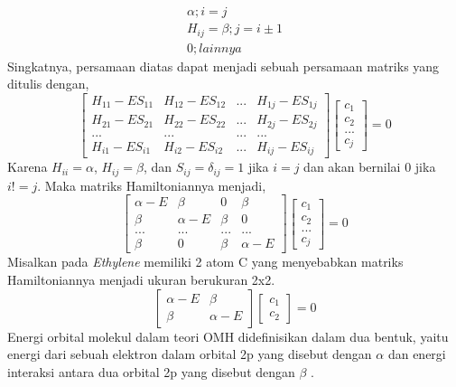 \documentclass[12pt,a4paper]{report}
\begin{document}
	\begin{equation}
	\begin{split}
	\alpha ; i = j
	\\
	H_{ij} = \beta ; j = i{\pm}1
	\\
	0 ; lainnya
	\end{split}
	\end{equation}
	Singkatnya, persamaan diatas dapat menjadi sebuah persamaan matriks yang ditulis dengan,
	\begin{equation}
	\begin{bmatrix}
	{H_{11}-ES_{11}} & {H_{12}-ES_{12}} & ... &{H_{1j}-ES_{1j}}\\
	{H_{21}-ES_{21}} & {H_{22}-ES_{22}} & ... &{H_{2j}-ES_{2j}}\\
	... & ... & ... & ... \\
	{H_{i1}-ES_{i1}} & {H_{i2}-ES_{i2}} & ... &{H_{ij}-ES_{ij}}
	\end{bmatrix}
	\begin{bmatrix}c_1 \\ c_2 \\ ... \\ c_j \end{bmatrix} = 0
	\end{equation}
	Karena {$H_{ii} = \alpha$}, {$H_{ij} = \beta$}, dan {$S_{ij} = \delta_{ij} = 1$} jika {$i=j$} dan akan bernilai 0 jika {$i!=j$}. Maka matriks Hamiltoniannya menjadi,
	\begin{equation}
	\begin{bmatrix}
	\alpha - E & \beta & 0 &\beta \\
	\beta & \alpha - E & \beta & 0\\
	... & ... & ... & ... \\
	\beta & 0 & \beta & \alpha - E
	\end{bmatrix}
	\begin{bmatrix}c_1 \\ c_2 \\ ... \\ c_j \end{bmatrix} = 0
	\end{equation}
	Misalkan pada \textit{Ethylene} memiliki 2 atom C yang menyebabkan matriks Hamiltoniannya menjadi ukuran berukuran 2x2.
	\begin{equation}
	\begin{bmatrix}
	\alpha - E & \beta \\
	\beta & \alpha - E
	\end{bmatrix}
	\begin{bmatrix}c_1 \\ c_2 \end{bmatrix} = 0
	\end{equation}
	Energi orbital molekul dalam teori OMH didefinisikan dalam dua bentuk, yaitu energi dari sebuah elektron dalam orbital 2p yang disebut dengan {$\alpha$} dan energi interaksi antara dua orbital 2p yang disebut dengan {$\beta$} \cite{Anil}\cite{Rustaman2008}.
	
\end{document}
